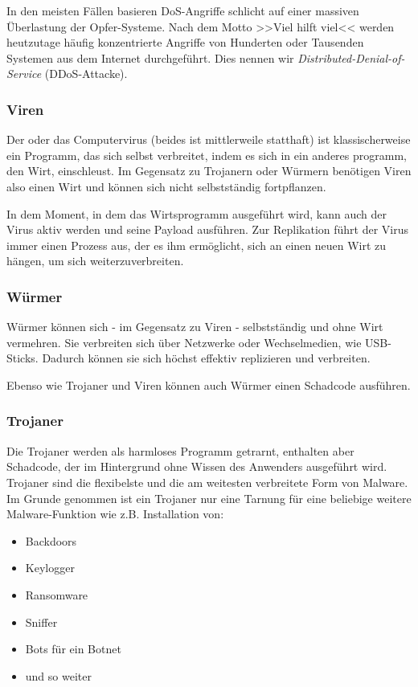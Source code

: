 In den meisten Fällen basieren DoS-Angriffe schlicht auf einer massiven Überlastung der Opfer-Systeme. Nach dem Motto >>Viel hilft viel<< werden heutzutage häufig konzentrierte Angriffe von Hunderten oder Tausenden Systemen aus dem Internet durchgeführt. Dies nennen wir \textit{Distributed-Denial-of-Service} (DDoS-Attacke).

\subsubsection{Viren}
\label{sec:Viren}

Der oder das Computervirus (beides ist mittlerweile statthaft) ist klassischerweise ein Programm, das sich selbst verbreitet, indem es sich in ein anderes programm, den Wirt, einschleust. Im Gegensatz zu Trojanern oder Würmern benötigen Viren also einen Wirt und können sich nicht selbstständig fortpflanzen.

In dem Moment, in dem das Wirtsprogramm ausgeführt wird, kann auch der Virus aktiv werden und seine Payload ausführen. Zur Replikation führt der Virus immer einen Prozess aus, der es ihm ermöglicht, sich an einen neuen Wirt zu hängen, um sich weiterzuverbreiten.

\subsubsection{Würmer}
\label{sec:Wuermer}

Würmer können sich - im Gegensatz zu Viren - selbstständig und ohne Wirt vermehren. Sie verbreiten sich über Netzwerke oder Wechselmedien, wie USB-Sticks. Dadurch können sie sich höchst effektiv replizieren und verbreiten.

Ebenso wie Trojaner und Viren können auch Würmer einen Schadcode ausführen.

\subsubsection{Trojaner}
\label{sec:Trojaner}

Die Trojaner werden als harmloses Programm getrarnt, enthalten aber Schadcode, der im Hintergrund ohne Wissen des Anwenders ausgeführt wird. Trojaner sind die flexibelste und die am weitesten verbreitete Form von Malware. Im Grunde genommen ist ein Trojaner nur eine Tarnung für eine beliebige weitere Malware-Funktion wie z.B. Installation von:

\begin{multicols}{2}
	\begin{itemize}
		\item Backdoors
		\item Keylogger
		\item Ransomware
		\item Sniffer
		\item Bots für ein Botnet
		\item und so weiter
	\end{itemize}
\end{multicols}

